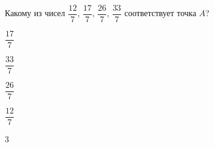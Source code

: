 \begin{ex}
	Какому из чисел $\dfrac{12}{7}$, $\dfrac{17}{7}$, $\dfrac{26}{7}$, $\dfrac{33}{7}$ соответствует точка $A$?
	
	\selectanswer
	\begin{enumcols}[columns=4]
		\item $\dfrac{17}{7}$
		\item $\dfrac{33}{7}$
		\item $\dfrac{26}{7}$
		\item $\dfrac{12}{7}$
	\end{enumcols}
	\begin{answer}
		3
	\end{answer}
\end{ex}